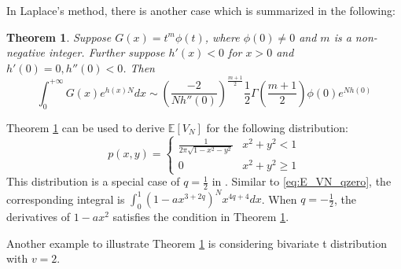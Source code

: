 \documentclass{article}
\newtheorem{theorem}{Theorem}
\def\E{\mathbb{E}}
\begin{document}
In Laplace's method, there is another case which is summarized in the following:
\begin{theorem}\label{thm:second_derivative_laplace}
    Suppose $G(x) = t^{m} \phi(t)$, where $\phi(0)\neq 0$
    and $m$ is a non-negative integer.
    Further suppose $h'(x)<0$ for $x> 0$ and $h'(0)=0, h''(0)<0$.
    Then
    \begin{equation}\label{eq:Laplace_ext_2}
        \int_0^{+\infty} G(x) e^{h(x)N} dx
        \sim \left(\frac{-2}{N h''(0)}\right)^{\frac{m+1}{2}}
        \frac{1}{2}\Gamma\left(\frac{m+1}{2} \right)
        \phi(0)e^{Nh(0)}     
    \end{equation}
\end{theorem}
Theorem \ref{thm:second_derivative_laplace}
can be used to derive $\E[V_N]$ for the following
distribution:
\begin{equation}
    p(x,y) =\begin{cases} 
        \frac{1}{2\pi \sqrt{1-x^2-y^2}} & x^2+y^2<1 \\
        0 & x^2 + y^2 \geq 1
    \end{cases}
\end{equation}
This distribution is a special case of $q=\frac{1}{2}$
in \cite{affentranger1991convex}.
Similar to \eqref{eq:E_VN_qzero},
the corresponding
integral is $\int_0^1 (1-a x^{3+2q})^N x^{4q+4} dx$.
When $q=-\frac{1}{2}$, the derivatives of $1-ax^2$
satisfies the condition in Theorem \ref{thm:second_derivative_laplace}.

Another example to illustrate Theorem \ref{thm:second_derivative_laplace}
is considering bivariate t distribution with $v=2$.



\end{document}
